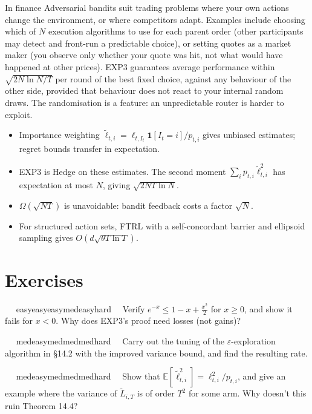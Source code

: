\documentclass[11pt,a4paper,openany]{book}
\newcommand{\E}{\mathbb{E}}
\newcommand{\eps}{\varepsilon}
\newcommand{\ind}{\mathbf{1}}
\newcommand{\extag}[2]{%
  \def\tmp{#1}\def\tmpE{easy}\def\tmpM{med}\def\tmpH{hard}%
  \ifx\tmp\tmpE\def\tagc{defc}\else\ifx\tmp\tmpM\def\tagc{thmc}\else\ifx\tmp\tmpH\def\tagc{warnc}\else\def\tagc{finc}\fi\fi\fi
  \tcbox[on line,boxrule=0pt,arc=2pt,colback=\tagc!12,left=2pt,right=2pt,top=0pt,bottom=0pt,boxsep=1pt]{\sffamily\scriptsize\bfseries\color{\tagc}#2}}
\newcommand{\exercise}[3]{\par\medskip\noindent\textbf{\sffamily #1}\ \ #2\ \ #3\par}
\begin{document}
\begin{bfin}{In finance}
Adversarial bandits suit trading problems where your own actions change the environment, or where competitors adapt. Examples include choosing which of $N$ execution algorithms to use for each parent order (other participants may detect and front-run a predictable choice), or setting quotes as a market maker (you observe only whether your quote was hit, not what would have happened at other prices). EXP3 guarantees average performance within $\sqrt{2N\ln N/T}$ per round of the best fixed choice, against any behaviour of the other side, provided that behaviour does not react to your internal random draws. The randomisation is a feature: an unpredictable router is harder to exploit.
\end{bfin}

\begin{takeaways}
\begin{itemize}
\item Importance weighting $\tilde\ell_{t,i}=\ell_{t,I_t}\ind[I_t=i]/p_{t,i}$ gives unbiased estimates; regret bounds transfer in expectation.
\item EXP3 is Hedge on these estimates. The second moment $\sum_ip_{t,i}\tilde\ell_{t,i}^2$ has expectation at most $N$, giving $\sqrt{2NT\ln N}$.
\item $\Omega(\sqrt{NT})$ is unavoidable: bandit feedback costs a factor $\sqrt N$.
\item For structured action sets, FTRL with a self-concordant barrier and ellipsoid sampling gives $O(d\sqrt{\theta T\ln T})$.
\end{itemize}
\end{takeaways}

\section*{Exercises}\label{ch14-ex}

\exercise{14.1}{\extag{easy}{warm-up}}{\hypertarget{sol-14.1}{}Verify $e^{-x}\le1-x+\frac{x^2}2$ for $x\ge0$, and show it fails for $x<0$. Why does EXP3's proof need losses (not gains)?}

\exercise{14.2}{\extag{med}{core}}{\hypertarget{sol-14.2}{}Carry out the tuning of the $\eps$-exploration algorithm in §14.2 with the improved variance bound, and find the resulting rate.}

\exercise{14.3}{\extag{med}{core}}{\hypertarget{sol-14.3}{}Show that $\E[\tilde\ell_{t,i}^2]=\ell_{t,i}^2/p_{t,i}$, and give an example where the variance of $\tilde L_{i,T}$ is of order $T^2$ for some arm. Why doesn't this ruin Theorem 14.4?}
\end{document}
